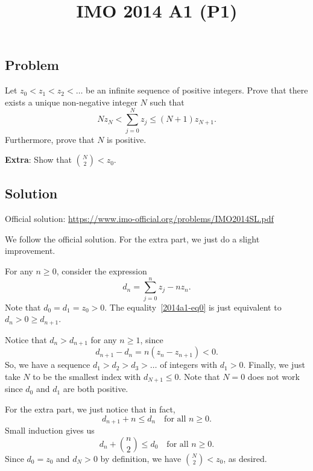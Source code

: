 \documentclass{article}
\title{IMO 2014 A1 (P1)}
\author{}
\date{}
\begin{document}
\maketitle



\subsection*{Problem}

Let $z_0 < z_1 < z_2 < \ldots$ be an infinite sequence of positive integers.
Prove that there exists a unique non-negative integer $N$ such that
\[ N z_N < \sum_{j = 0}^N z_j \leq (N + 1) z_{N + 1}. \tag{*}\label{2014a1-eq0} \]
Furthermore, prove that $N$ is positive.

\textbf{Extra}: Show that $\displaystyle \binom{N}{2} < z_0$.



\subsection*{Solution}

Official solution: \url{https://www.imo-official.org/problems/IMO2014SL.pdf}

We follow the official solution.
For the extra part, we just do a slight improvement.

For any $n \geq 0$, consider the expression
\[ d_n = \sum_{j = 0}^n z_j - n z_n. \]
Note that $d_0 = d_1 = z_0 > 0$.
The equality~\eqref{2014a1-eq0} is just equivalent to $d_n > 0 \geq d_{n + 1}$.

Notice that $d_n > d_{n + 1}$ for any $n \geq 1$, since
\[ d_{n + 1} - d_n = n (z_n - z_{n + 1}) < 0. \]
So, we have a sequence $d_1 > d_2 > d_3 > \ldots$ of integers with $d_1 > 0$.
Finally, we just take $N$ to be the smallest index with $d_{N + 1} \leq 0$.
Note that $N = 0$ does not work since $d_0$ and $d_1$ are both positive.

For the extra part, we just notice that in fact,
\[ d_{n + 1} + n \leq d_n \quad \text{for all } n \geq 0. \]
Small induction gives us
\[ d_n + \binom{n}{2} \leq d_0 \quad \text{for all } n \geq 0. \]
Since $d_0 = z_0$ and $d_N > 0$ by definition, we have $\displaystyle \binom{N}{2} < z_0$, as desired.
\end{document}
